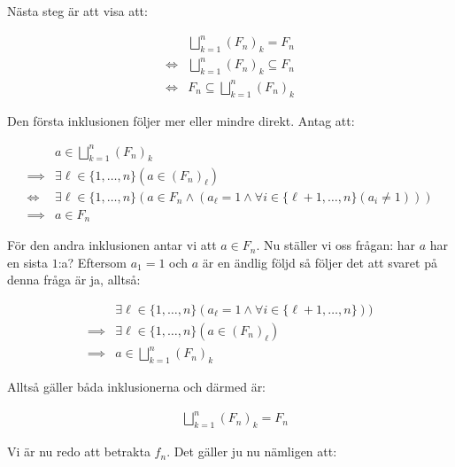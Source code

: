 \documentclass{tufte-handout}
\begin{document}
\begin{ans}
    Nästa steg är att visa att:

    \vspace{-4mm}
    
    \begin{align*}
        &\bigsqcup_{k = 1}^{n} (F_n)_k = F_n \\
        \iff &\bigsqcup_{k = 1}^{n} (F_n)_k \subseteq F_n \\
        \iff &F_n \subseteq \bigsqcup_{k = 1}^{n} (F_n)_k
    \end{align*}

    Den första inklusionen följer mer eller mindre direkt. Antag att:

    \vspace{-4mm}
    
    \begin{align*}
        &a \in \bigsqcup_{k = 1}^{n} (F_n)_k \\
        \implies &\exists \ell \in \{1, \ldots, n\} (a \in (F_n)_\ell) \\
        \iff &\exists \ell \in \{1, \ldots, n\} (a \in F_n \land (a_\ell = 1 \land \forall i \in \{\ell + 1, \ldots, n\} (a_i \neq 1))) \\
        \implies &a \in F_n
    \end{align*}

    För den andra inklusionen antar vi att $a \in F_n$. Nu ställer vi oss frågan: har $a$ har en sista $1$:a? Eftersom $a_1 = 1$ och $a$ är en ändlig följd så följer det att svaret på denna fråga är ja, alltså:

    \vspace{-4mm}

    \begin{align*}
        &\exists \ell \in \{1, \ldots, n\} (a_\ell = 1 \land \forall i \in \{\ell + 1, \ldots, n\})) \\
        \implies &\exists \ell \in \{1, \ldots, n\} (a \in (F_n)_\ell) \\
        \implies &a \in \bigsqcup_{k = 1}^{n} (F_n)_k
    \end{align*}

    Alltså gäller båda inklusionerna och därmed är:

    \vspace{-4mm}
    
    \begin{align*}
        &\bigsqcup_{k = 1}^{n} (F_n)_k = F_n
    \end{align*}

    Vi är nu redo att betrakta $f_n$. Det gäller ju nu nämligen att:


\end{ans}
\end{document}
